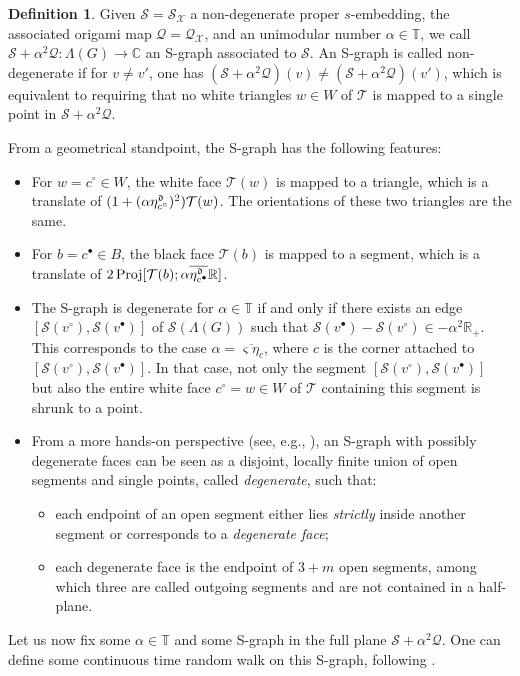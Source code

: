 \documentclass[reqno]{amsart}
\numberwithin{equation}{section}
\theoremstyle{definition}
\newtheorem{definition}[theo]{Definition}
\theoremstyle{remark}
\newcommand\C{\mathbb{C}}
\newcommand\cQ{\mathcal{Q}}
\newcommand\cS{\mathcal{S}}
\newcommand\cX{\mathcal{X}}
\newcommand\cT{\mathcal{T}}
\begin{document}
 \begin{definition}\label{def:S-graph} Given $\cS=\cS_\cX$ a non-degenerate proper $s$-embedding, the associated origami map $\cQ=\cQ_\cX$, and an unimodular number $\alpha\in\mathbb{T}$, we call $\cS+\alpha^2\cQ:\Lambda(G)\to \C$ an S-graph associated to $\cS$. An S-graph is called non-degenerate if for $v\ne v'$, one has $(\cS+\alpha^2\cQ)(v)\ne(\cS+\alpha^2\cQ)(v')$, which is equivalent to requiring that no white triangles $ w\in W$ of $\cT$ is mapped to a single point in $\cS+\alpha^2\cQ$.
\end{definition}
From a geometrical standpoint, the S-graph has the following features:
\begin{itemize}
    \item For $w = c^\circ \in W$, the white face $\cT(w)$ is mapped to a triangle, which is a translate of $(1 + (\alpha \eta^{\frak{d}}_{c^{\circ}})^2)\cT(w)$. The orientations of these two triangles are the same.
    
    \item For $b = c^\bullet \in B$, the black face $\cT(b)$ is mapped to a segment, which is a translate of $2\,\mathrm{Proj}[\cT(b); \alpha \overline{\eta^{\frak{d}}_{c^{\bullet}}}\mathbb{R}]$.
    
    \item The S-graph is degenerate for $\alpha \in \mathbb{T}$ if and only if there exists an edge $[\cS(v^\circ), \cS(v^\bullet)]$ of $\cS(\Lambda(G))$ such that $\cS(v^\bullet) - \cS(v^\circ) \in -\alpha^2 \mathbb{R}_+$. This corresponds to the case $\alpha = \overline{\varsigma \eta_c}$, where $c$ is the corner attached to $[\cS(v^\circ), \cS(v^\bullet)]$. In that case, not only the segment $[\cS(v^\circ), \cS(v^\bullet)]$ but also the entire white face $c^\circ=w \in W$ of $\cT$ containing this segment is shrunk to a point.
    
    \item From a more hands-on perspective (see, e.g., \cite[Definition~4.2]{CLR1}), an S-graph with possibly degenerate faces can be seen as a disjoint, locally finite union of open segments and single points, called \emph{degenerate}, such that:
    \begin{itemize}
        \item each endpoint of an open segment either lies \emph{strictly} inside another segment or corresponds to a \emph{degenerate face};
        \item each degenerate face is the endpoint of $3 + m$ open segments, among which three are called outgoing segments and are not contained in a half-plane.
    \end{itemize}
\end{itemize}
Let us now fix some $\alpha \in \mathbb{T}$ and some S-graph in the full plane $\cS+\alpha^2\cQ$. One can define some continuous time random walk on this S-graph, following \cite[Definitions 4.4 and 4.6]{CLR1}.
\end{document}
